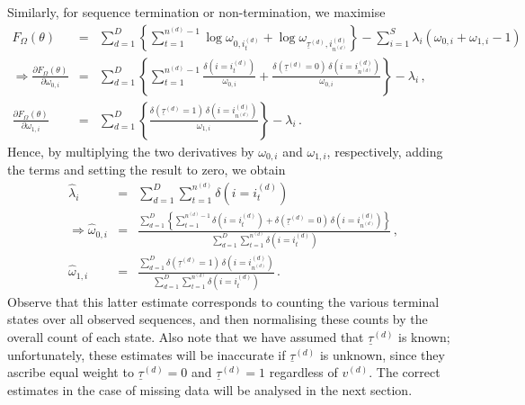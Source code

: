 \documentclass[a4paper]{article}
\newcommand{\ut}{\underline{\tau}}
\begin{document}
Similarly, for sequence termination or non-termination, we maximise
\begin{eqnarray}
  F_{\Omega}(\theta) & = & \sum_{d=1}^D \left\{\sum_{t=1}^{n^{(d)}-1}\log\omega_{0,i_{t}^{(d)}}+\log\omega_{\ut^{(d)},i_{n^{(d)}}^{(d)}}\right\}
-\sum_{i=1}^{S}\lambda_i\left(\omega_{0,i}+\omega_{1,i}-1\right)
\label{eq:F:omega}
\\
\Rightarrow\frac{\partial F_{\Omega}(\theta)}{\partial\omega_{0,i}} & = &
\sum_{d=1}^D \left\{\sum_{t=1}^{n^{(d)}-1}\frac{\delta(i=i_{t}^{(d)})}{\omega_{0,i}}
   +\frac{\delta(\ut^{(d)}\!=\!0)\,\delta(i=i_{n^{(d)}}^{(d)})}{\omega_{0,i}}\right\}
-\lambda_i\,,
\nonumber\\
\frac{\partial F_{\Omega}(\theta)}{\partial\omega_{1,i}} & = &
\sum_{d=1}^D \left\{\frac{\delta(\ut^{(d)}\!=\!1)\,\delta(i=i_{n^{(d)}}^{(d)})}{\omega_{1,i}}\right\}
-\lambda_i\,.
\end{eqnarray}
Hence, by multiplying the two derivatives by $\omega_{0,i}$ and $\omega_{1,i}$, respectively, adding the terms and setting the result to zero, we obtain
\begin{eqnarray}
\hat{\lambda}_i & = & \sum_{d=1}^D \sum_{t=1}^{n^{(d)}}\delta(i=i_{t}^{(d)})
\nonumber\\
\Rightarrow \hat{\omega}_{0,i} & = & 
\frac{\sum_{d=1}^D \left\{\sum_{t=1}^{n^{(d)}-1}\delta(i=i_{t}^{(d)})
   +\delta(\ut^{(d)}\!=\!0)\,\delta(i=i_{n^{(d)}}^{(d)})\right\}}
     {\sum_{d=1}^D \sum_{t=1}^{n^{(d)}}\delta(i=i_{t}^{(d)})}\,,
\nonumber\\
\hat{\omega}_{1,i} & = & \frac{\sum_{d=1}^D\delta(\ut^{(d)}\!=\!1)\,\delta(i=i_{n^{(d)}}^{(d)})}
                                                  {\sum_{d=1}^D \sum_{t=1}^{n^{(d)}}\delta(i=i_{t}^{(d)})}\,.
\label{eq:F:omega:sol}
\end{eqnarray}
Observe that this latter estimate corresponds to counting the various terminal states over all observed sequences, and then normalising these counts by the overall count of each state.
Also note that we have assumed that $\ut^{(d)}$ is known; unfortunately, these estimates will be inaccurate if $\ut^{(d)}$ is unknown,
since they ascribe equal weight to $\ut^{(d)}=0$ and $\ut^{(d)}=1$ regardless of $v^{(d)}$.
The correct estimates in the case of missing data will be analysed in the next section.
\end{document}
